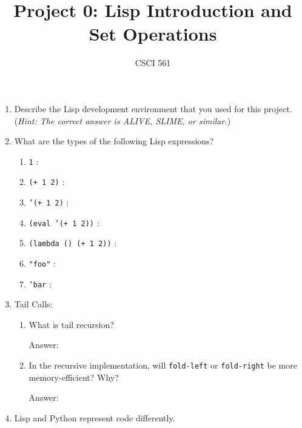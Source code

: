 \documentclass[12pt,letterpaper]{ntdhw}
\title{Project 0: Lisp Introduction and Set Operations}
\author{CSCI 561}
\begin{document}
\pagestyle{fancyplain}

\maketitle
\thispagestyle{fancyplain}

\begin{enumerate}

  \item Describe the Lisp development environment that you used for
  this project.  (\emph{Hint: The correct answer is ALIVE, SLIME, or
    similar.})

  \item What are the types of the following Lisp expressions?
  \begin{enumerate}
    \item {\tt 1} : \emph{
    }
    \item {\tt (+ 1 2)} : \emph{
    }
    \item {\tt '(+ 1 2)} : \emph{
    }
    \item {\tt (eval '(+ 1 2))} : \emph{
    }
    \item {\tt (lambda () (+ 1 2))} : \emph{
    }
    \item {\tt "foo"} : \emph{
    }
    \item {\tt 'bar} : \emph{
    }
  \end{enumerate}

  \item Tail Calls:
  \begin{enumerate}
    \item What is tail recursion?

    \begin{emph}
      Answer: %
    \end{emph}

    \item In the recursive implementation, will {\tt fold-left} or
    {\tt fold-right} be more memory-efficient?  Why?

    \begin{emph}
      Answer: %
    \end{emph}
  \end{enumerate}

  \item Lisp and Python represent code differently.


\end{enumerate}
\end{document}
